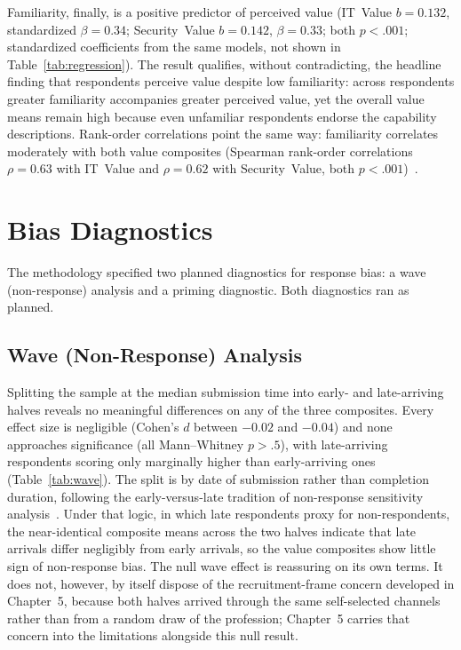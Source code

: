 Familiarity, finally, is a positive predictor of perceived value (IT~Value $b=0.132$, standardized $\beta=0.34$; Security~Value $b=0.142$, $\beta=0.33$; both $p<.001$; standardized coefficients from the same models, not shown in Table~\ref{tab:regression}).
The result qualifies, without contradicting, the headline finding that respondents perceive value despite low familiarity: across respondents greater familiarity accompanies greater perceived value, yet the overall value means remain high because even unfamiliar respondents endorse the capability descriptions. Rank-order correlations point the same way: familiarity correlates moderately with both value composites (Spearman rank-order correlations $\rho=0.63$ with IT~Value and $\rho=0.62$ with Security~Value, both $p<.001$)~\parencite{Spearman_1904}.



\section{Bias Diagnostics}

The methodology specified two planned diagnostics for response bias: a wave (non-response) analysis and a priming diagnostic. Both diagnostics ran as planned.

\subsection{Wave (Non-Response) Analysis}

Splitting the sample at the median submission time into early- and late-arriving halves reveals no meaningful differences on any of the three composites. Every effect size is negligible (Cohen's $d$ between $-0.02$ and $-0.04$) and none approaches significance (all Mann--Whitney $p>.5$), with late-arriving respondents scoring only marginally higher than early-arriving ones (Table~\ref{tab:wave}). The split is by date of submission rather than completion duration, following the early-versus-late tradition of non-response sensitivity analysis~\parencite{Armstrong_Overton_1977}. Under that logic, in which late respondents proxy for non-respondents, the near-identical composite means across the two halves indicate that late arrivals differ negligibly from early arrivals, so the value composites show little sign of non-response bias. The null wave effect is reassuring on its own terms. It does not, however, by itself dispose of the recruitment-frame concern developed in Chapter~5, because both halves arrived through the same self-selected channels rather than from a random draw of the profession; Chapter~5 carries that concern into the limitations alongside this null result.

